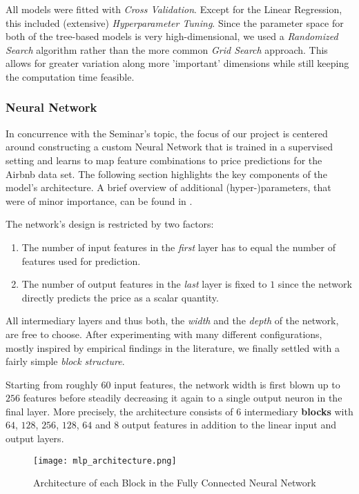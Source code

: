 All models were fitted with \emph{Cross Validation}.
Except for the Linear Regression, this included (extensive) \emph{Hyperparameter Tuning}.
Since the parameter space for both of the tree-based models is very high-dimensional, we used a \emph{Randomized Search} algorithm \citep{bergstra2012} rather than the more common \emph{Grid Search} approach.
This allows for greater variation along more 'important' dimensions while still keeping the computation time feasible.


\subsubsection{Neural Network} \label{neural-network}

In concurrence with the Seminar's topic, the focus of our project is centered around constructing a custom Neural Network that is trained in a supervised setting and learns to map feature combinations to price predictions for the Airbnb data set.
The following section highlights the key components of the model's architecture.
A brief overview of additional (hyper-)parameters, that were of minor importance, can be found in .

The network's design is restricted by two factors:
\begin{enumerate}
  \item The number of input features in the \emph{first} layer has to equal the number of features used for prediction.
  \item The number of output features in the \emph{last} layer is fixed to $1$ since the network directly predicts the price as a scalar quantity.
\end{enumerate}
All intermediary layers and thus both, the \emph{width} and the \emph{depth} of the network, are free to choose.
After experimenting with many different configurations, mostly inspired by empirical findings in the literature, we finally settled with a fairly simple \emph{block structure}.

Starting from roughly $60$ input features, the network width is first blown up to $256$ features before steadily decreasing it again to a single output neuron in the final layer.
More precisely, the architecture consists of $6$ intermediary \textbf{blocks} with $64$, $128$, $256$, $128$, $64$ and $8$ output features in addition to the linear input and output layers.

\begin{figure}[t]
  \centering
  \texttt{[image: mlp\_architecture.png]}
  \caption{Architecture of each Block in the Fully Connected Neural Network}
  \label{fig:linear-block}
\end{figure}

